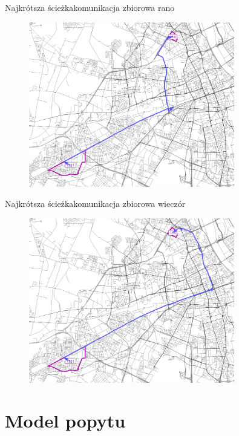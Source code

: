 \documentclass[8pt]{beamer}
\begin{document}
\begin{frame}{Najkrótsza ścieżka}{komunikacja zbiorowa rano}
\begin{figure}\begin{center}
\includegraphics[width=0.8\textwidth]{path_transit}
 \end{center}  \end{figure} 
\end{frame}

\begin{frame}{Najkrótsza ścieżka}{komunikacja zbiorowa wieczór}
\begin{figure}\begin{center}
\includegraphics[width=0.8\textwidth]{path_transit2}
 \end{center}  \end{figure} 
\end{frame}

\section{Model popytu}
\end{document}
